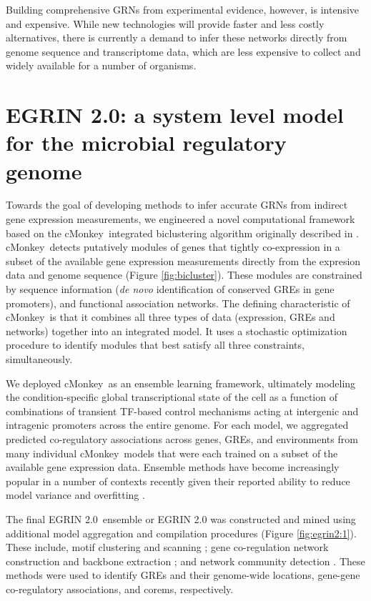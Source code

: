 \documentclass{article}
\newcommand{\tmsamp}[1]{\textsf{#1}}
\newcommand{\cm}{\tmsamp{cMonkey}}
\newcommand{\egrine}{{\tmsamp{EGRIN 2.0}}}
\begin{document}
Building comprehensive GRNs from experimental evidence, however, is intensive and expensive. While new technologies will provide faster and less costly alternatives, there is currently a demand to infer these networks directly from genome sequence and transcriptome data, which are less expensive to collect and widely available for a number of organisms. 

\section{\egrine: a system level model for the microbial regulatory genome} 

Towards the goal of developing methods to infer accurate GRNs from indirect gene expression measurements, we engineered a novel computational framework based on the \cm\ integrated biclustering algorithm originally described in \cite{reiss_integrated_2006}. \cm\ detects putatively modules of genes that tightly co-expression in a subset of the available gene expression measurements directly from the expresion data and genome sequence (Figure \ref{fig:bicluster}). These modules are constrained by sequence information (\textit{de novo} identification of conserved GREs in gene promoters), and functional association networks. The defining characteristic of \cm\ is that it combines all three types of data (expression, GREs and networks) together into an integrated model. It uses a stochastic optimization procedure to identify modules that best satisfy all three constraints, simultaneously.

We deployed \cm\ as an ensemble learning framework, ultimately modeling the condition-specific global transcriptional state of the cell as a function of combinations of transient TF-based control mechanisms acting at intergenic and intragenic promoters across the entire genome. For each model, we aggregated predicted co-regulatory associations across genes, GREs, and environments from many individual \cm\ models that were each trained on a subset of the available gene expression data. Ensemble methods have become increasingly popular in a number of contexts recently given their reported ability to reduce model variance and overfitting \cite{seni_ensemble_2010}. 

The final \egrine~ensemble or EGRIN 2.0 was constructed and mined using additional model aggregation and compilation procedures (Figure \ref{fig:egrin2:1}). These include, motif clustering \cite{van_dongen_using_2012} and scanning \cite{bailey_methods_1998}; gene co-regulation network construction and backbone extraction \cite{serrano_extracting_2009}; and network community detection \cite{ahn_link_2010}. These methods were used to identify GREs and their genome-wide locations, gene-gene co-regulatory associations, and corems, respectively.\\
\end{document}

